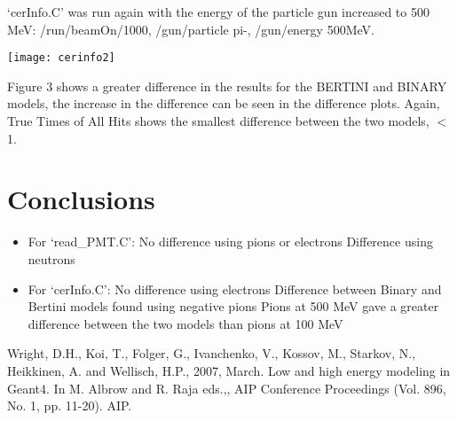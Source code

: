 \documentclass[a0,portrait]{a0poster}
\begin{document}
\begin{multicols}{2}
`cerInfo.C' was run again with the energy of the particle gun increased to 500 MeV:  /run/beamOn/1000, /gun/particle pi-, /gun/energy 500MeV.
\begin{center}\vspace{0cm}
	\texttt{[image: cerinfo2]}
\end{center}\vspace{0cm}

Figure 3 shows a greater difference in the results for the \textcolor{Red1}{BERTINI} and \textcolor{Blue1}{BINARY} models, the increase in the difference can be seen in the difference plots. Again, True Times of All Hits shows the smallest difference between the two models, $<$1.



\color{Turquoise4} %

\section*{Conclusions}

\begin{itemize}
\item For ‘read\_PMT.C’:
\subitem No difference using pions or electrons
\subitem Difference using neutrons 
\item For ‘cerInfo.C’:
\subitem No difference using electrons
\subitem Difference between Binary and Bertini models found using negative pions
\subitem Pions at 500 MeV gave a greater difference between the two models than pions at 100 MeV
\end{itemize}

\color{SlateBlue4} %


\begin{thebibliography}{}
Wright, D.H., Koi, T., Folger, G., Ivanchenko, V., Kossov, M., Starkov, N., Heikkinen, A. and Wellisch, H.P., 2007, March. Low and high energy modeling in Geant4. In M. Albrow and R. Raja eds.,, AIP Conference Proceedings (Vol. 896, No. 1, pp. 11-20). AIP.
\end{thebibliography}



\end{multicols}
\end{document}
